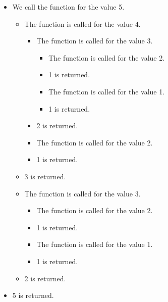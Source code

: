 \documentclass[a4paper]{article}
\begin{document}
\begin{itemize}
\item We call the function for the value 5.
    \begin{itemize}
        \item The function is called for the value 4.
        \begin{itemize}
            \item The function is called for the value 3.
            \begin{itemize}
                \item The function is called for the value 2.
                \item 1 is returned.
            \end{itemize}
            \begin{itemize}
                \item The function is called for the value 1.
                \item 1 is returned.
            \end{itemize}
            \item 2 is returned.
        \end{itemize}
        \begin{itemize}
            \item The function is called for the value 2.
            \item 1 is returned.
        \end{itemize}
    \item 3 is returned.
    \end{itemize}
    \begin{itemize}
        \item The function is called for the value 3.
        \begin{itemize}
            \item The function is called for the value 2.
            \item 1 is returned.
        \end{itemize}
        \begin{itemize}
            \item The function is called for the value 1.
            \item 1 is returned.
        \end{itemize}
        \item 2 is returned.
    \end{itemize}
    \item 5 is returned.
\end{itemize}
\end{document}

